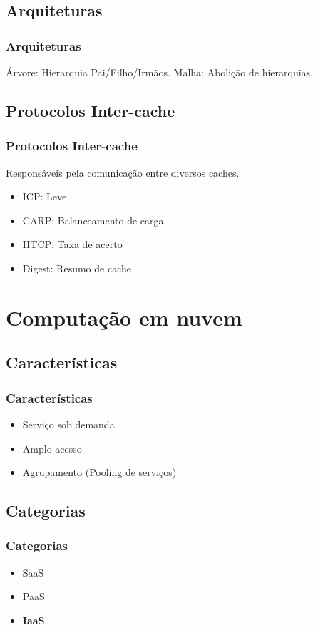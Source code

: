\documentclass{beamer}
\begin{document}
   \subsection{Arquiteturas}
    \begin{frame}
      \frametitle{Arquiteturas}
      Árvore: Hierarquia Pai/Filho/Irmãos.
      Malha: Abolição de hierarquias.
    \end{frame}

    \subsection{Protocolos Inter-cache}
    \begin{frame}
      \frametitle{Protocolos Inter-cache}
      Responsáveis pela comunicação entre diversos caches.
      \begin{itemize}
       \item ICP: Leve
       \item CARP: Balanceamento de carga
       \item HTCP: Taxa de acerto
       \item Digest: Resumo de cache
      \end{itemize} 
    \end{frame} 

    \section{Computação em nuvem}
    \subsection{Características}
    \begin{frame}
      \frametitle{Características}
      \begin{itemize}
       \item Serviço sob demanda
       \item Amplo acesso
       \item Agrupamento (Pooling de serviços)
      \end{itemize}
    \end{frame}

    \subsection{Categorias}
    \begin{frame}
      \frametitle{Categorias}
      \begin{itemize}
       \item SaaS
       \item PaaS
       \item \textbf{IaaS}
      \end{itemize}
    \end{frame}
\end{document}
